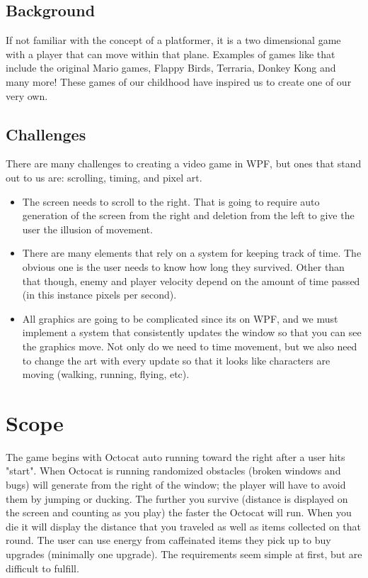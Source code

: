 \documentclass[10pt,conference,onecolumn,compsoc]{IEEEtran}
\begin{document}
\subsection{Background}
If not familiar with the concept of a platformer, it is a two dimensional game with a player that can move within that plane. Examples of games like that include the original Mario games, Flappy Birds, Terraria, Donkey Kong and many more! These games of our childhood have inspired us to create one of our very own.



\subsection{Challenges}
There are many challenges to creating a video game in WPF, but ones that stand out to us are: scrolling, timing, and pixel art.

\begin{itemize}

\item The screen needs to scroll to the right. That is going 	to require auto generation of the screen from the right and 		deletion from the left to give the user the illusion of 			movement. 

\item There are many elements that rely on a system for keeping track of time. The obvious one is the user needs to know how long they survived. Other than that though, enemy and player velocity depend on the amount of time passed (in this instance pixels per second).

\item All graphics are going to be complicated since its on WPF, and we must implement a system that consistently updates the window so that you can see the graphics move. Not only do we need to time movement, but we also need to change the art with every update so that it looks like characters are moving (walking, running, flying, etc).

\end{itemize}

\section{Scope}
The game begins with Octocat auto running toward the right after a user hits "start". When Octocat is running randomized obstacles (broken windows and bugs) will generate from the right of the window; the player will have to avoid them by jumping or ducking. The further you survive (distance is displayed on the screen and counting as you play) the faster the Octocat will run. When you die it will display the distance that you traveled as well as items collected on that round. The user can use energy from caffeinated items they pick up to buy upgrades (minimally one upgrade). The requirements seem simple at first, but are difficult to fulfill.
\end{document}
